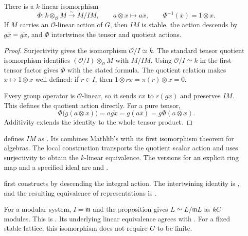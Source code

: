 \begin{proposition}
\label{lib:reduction:tensor-quotient-theorem}
There is a $k$-linear isomorphism
\[
 \Phi:k\otimes_{\mathcal O}M\xrightarrow{\sim}M/IM,
 \qquad a\otimes x\longmapsto a\overline x,
 \qquad \Phi^{-1}(\overline x)=1\otimes x.
\]
If $M$ carries an $\mathcal O$-linear action of $G$, then $IM$ is stable,
the action descends by $g\overline x=\overline{gx}$, and $\Phi$ intertwines
the tensor and quotient actions.
\end{proposition}
\begin{proof}
Surjectivity gives the isomorphism $\mathcal O/I\simeq k$.
The standard tensor quotient isomorphism identifies
$(\mathcal O/I)\otimes_{\mathcal O}M$ with $M/IM$. Using
$\mathcal O/I\simeq k$ in the first tensor factor gives $\Phi$ with the stated
formula. The quotient relation makes $\overline x\mapsto1\otimes x$
well defined: if $r\in I$, then
$1\otimes rx=\pi(r)\otimes x=0$.

Every group operator is $\mathcal O$-linear, so it sends $rx$ to $r(gx)$
and preserves $IM$. This defines the quotient action directly. For a pure
tensor,
\[
 \Phi\bigl(g(a\otimes x)\bigr)=a\overline{gx}
   =g(a\overline x)=g\Phi(a\otimes x).
\]
Additivity extends the identity to the whole tensor product.
\end{proof}

\begin{implementation}
 defines $IM$ as
. Its 
combines Mathlib's  with
its first isomorphism theorem for algebras. The local construction
transports the quotient scalar action and uses surjectivity to obtain
the $k$-linear equivalence. The versions for an explicit ring map and a
specified ideal are  and
.

 first constructs
 by descending the integral
action. The intertwining identity is
, and the resulting equivalence
of representations is .
\end{implementation}

For a modular system, $I=\mathfrak m$ and the proposition gives
$\overline L\simeq L/\mathfrak mL$ as $kG$-modules. This is
. Its underlying linear
equivalence agrees with
.
For a fixed stable lattice, this isomorphism does not require $G$ to be finite.

